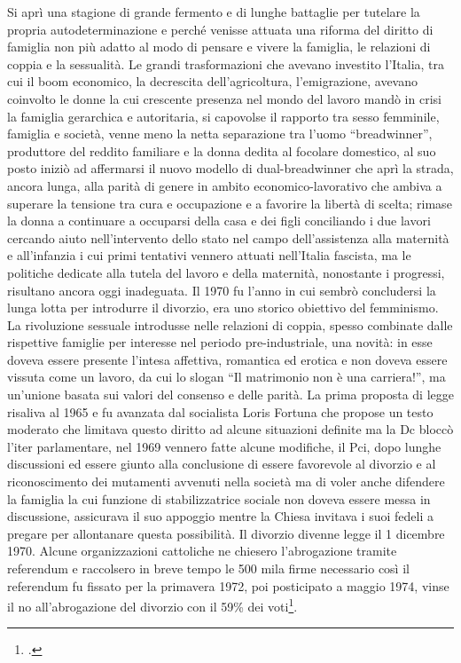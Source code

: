 Si aprì una stagione di grande fermento e di lunghe battaglie per tutelare la propria autodeterminazione e perché venisse attuata una riforma del diritto di famiglia non più adatto al modo di pensare e vivere la famiglia, le relazioni di coppia e la sessualità.
Le grandi trasformazioni che avevano investito l'Italia, tra cui il boom economico, la decrescita dell'agricoltura, l'emigrazione, avevano coinvolto le donne la cui crescente presenza nel mondo del lavoro mandò in crisi la famiglia gerarchica e autoritaria, si capovolse il rapporto tra sesso femminile, famiglia e società, venne meno la netta separazione tra l'uomo \enquote{breadwinner}, produttore del reddito familiare e la donna dedita al focolare domestico, al suo posto iniziò ad affermarsi il nuovo modello di dual-breadwinner che aprì la strada, ancora lunga, alla parità di genere in ambito economico-lavorativo che ambiva a superare la tensione tra cura e occupazione e a favorire la libertà di scelta; rimase la donna a continuare a occuparsi della casa e dei figli conciliando i due lavori cercando aiuto nell'intervento dello stato nel campo dell'assistenza alla maternità e all'infanzia i cui primi tentativi vennero attuati nell'Italia fascista, ma le politiche dedicate alla tutela del lavoro e della maternità, nonostante i progressi, risultano ancora oggi inadeguata.
Il 1970 fu l'anno in cui sembrò concludersi la lunga lotta per introdurre il divorzio, era uno storico obiettivo del femminismo.
La rivoluzione sessuale introdusse nelle relazioni di coppia, spesso combinate dalle rispettive famiglie per interesse nel periodo pre-industriale, una novità: in esse doveva essere presente l'intesa affettiva, romantica ed erotica e non doveva essere vissuta come un lavoro, da cui lo slogan \enquote{Il matrimonio non è una carriera!}, ma un'unione basata sui valori del consenso e delle parità.
La prima proposta di legge risaliva al 1965 e fu avanzata dal socialista Loris Fortuna che propose un testo moderato che limitava questo diritto ad alcune situazioni definite ma la Dc bloccò l'iter parlamentare, nel 1969 vennero fatte alcune modifiche, il Pci, dopo lunghe discussioni ed essere giunto alla conclusione di essere favorevole al divorzio e al riconoscimento dei mutamenti avvenuti nella società ma di voler anche difendere la famiglia la cui funzione di stabilizzatrice sociale non doveva essere messa in discussione, assicurava il suo appoggio mentre la Chiesa invitava i suoi fedeli a pregare per allontanare questa possibilità.
Il divorzio divenne legge il 1 dicembre 1970.
Alcune organizzazioni cattoliche ne chiesero l'abrogazione tramite referendum e raccolsero in breve tempo le 500 mila firme necessario così il referendum fu fissato per la primavera 1972, poi posticipato a maggio 1974, vinse il no all'abrogazione del divorzio con il 59\% dei voti\footcite{Istat3}.

